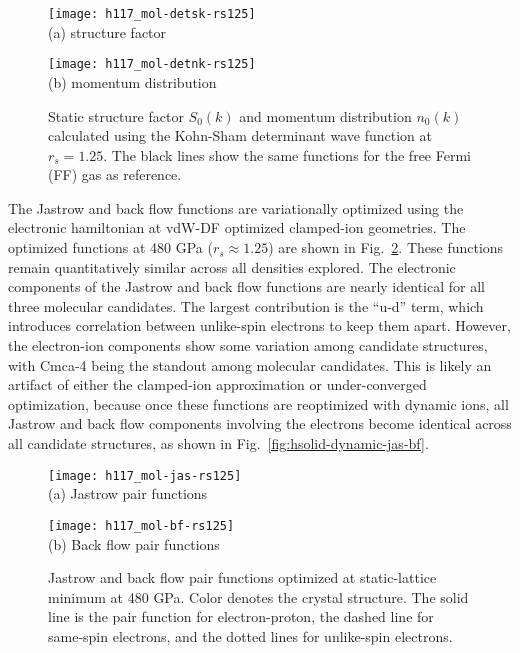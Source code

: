\begin{figure}[h]
\centering
\begin{minipage}{0.49\textwidth}
\centering
\texttt{[image: h117\_mol-detsk-rs125]}\\
(a) structure factor
\end{minipage}
\begin{minipage}{0.49\textwidth}
\centering
\texttt{[image: h117\_mol-detnk-rs125]}\\
(b) momentum distribution
\end{minipage}
\caption{Static structure factor $S_0(k)$ and momentum distribution $n_0(k)$ calculated using the Kohn-Sham determinant wave function at $r_s=1.25$. The black lines show the same functions for the free Fermi (FF) gas as reference.}
\label{fig:hsolid-det-sk-nk}
\end{figure}

The Jastrow and back flow functions are variationally optimized using the electronic hamiltonian at vdW-DF optimized clamped-ion geometries. The optimized functions at 480 GPa ($r_s\approx 1.25$) are shown in Fig.~\ref{fig:hsolid-static-jas-bf}.
These functions remain quantitatively similar across all densities explored.
The electronic components of the Jastrow and back flow functions are nearly identical for all three molecular candidates.
The largest contribution is the ``u-d'' term, which introduces correlation between unlike-spin electrons to keep them apart.
However, the electron-ion components show some variation among candidate structures, with Cmca-4 being the standout among molecular candidates.
This is likely an artifact of either the clamped-ion approximation or under-converged optimization, because once these functions are reoptimized with dynamic ions, all Jastrow and back flow components involving the electrons become identical across all candidate structures, as shown in Fig.~\ref{fig:hsolid-dynamic-jas-bf}.

\begin{figure}[h]
\centering
\begin{minipage}{0.49\textwidth}
\centering
\texttt{[image: h117\_mol-jas-rs125]}\\
(a) Jastrow pair functions
\end{minipage}
\begin{minipage}{0.49\textwidth}
\centering
\texttt{[image: h117\_mol-bf-rs125]}\\
(b) Back flow pair functions
\end{minipage}
\caption{Jastrow and back flow pair functions optimized at static-lattice minimum at 480 GPa. Color denotes the crystal structure. The solid line is the pair function for electron-proton, the dashed line for same-spin electrons, and the dotted lines for unlike-spin electrons.}
\label{fig:hsolid-static-jas-bf}
\end{figure}

